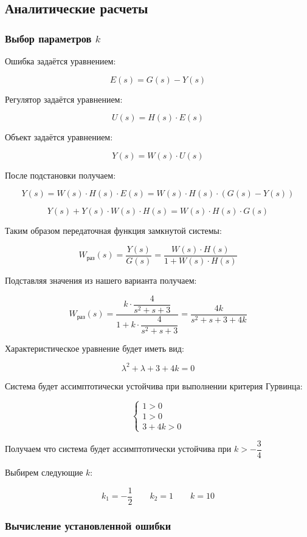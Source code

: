 \documentclass[a5paper, 10pt]{article}
\theoremstyle{definition}
\theoremstyle{plain}
\theoremstyle{remark}
\begin{document}
\subsection{Аналитические расчеты}

\subsubsection{Выбор параметров $k$}

Ошибка задаётся уравнением:

$$
E(s)=G(s)-Y(s)
$$

Регулятор задаётся уравнением:

$$
U(s)=H(s)\cdot E(s)
$$

Объект задаётся уравнением:

$$
Y(s)=W(s)\cdot U(s)
$$

После подстановки получаем:

$$
Y(s)=W(s)\cdot H(s) \cdot E(s)=W(s)\cdot H(s) \cdot (G(s)-Y(s))
$$

$$
Y(s)+Y(s)\cdot W(s)\cdot H(s)=W(s)\cdot H(s)\cdot G(s)
$$

Таким образом передаточная функция замкнутой системы:

$$
W_{\text{раз}}(s)=\dfrac{Y(s)}{G(s)}= \dfrac{W(s)\cdot H(s)}{1+W(s)\cdot H(s)}
$$

Подставляя значения из нашего варианта получаем:

$$
W_{\text{раз}}(s)=\dfrac{k\cdot \dfrac{4}{s^2+s+3}}{1+k\cdot \dfrac{4}{s^2+s+3}}=\dfrac{4k}{s^2+s+3+4k}
$$

Характеристическое уравнение будет иметь вид:

$$
\lambda^2+\lambda+3+4k=0
$$

Система будет ассимптотически устойчива при выполнении критерия Гурвинца:

$$
\begin{cases}
    1>0\\
    1>0\\
    3+4k>0
\end{cases}
$$

Получаем что система будет ассимптотически устойчива при $k>-\dfrac{3}{4}$

Выбирем следующие $k$:

$$
k_1=-\dfrac{1}{2} \qquad k_2=1 \qquad k=10
$$

\subsubsection{Вычисление установленной ошибки}
\end{document}
